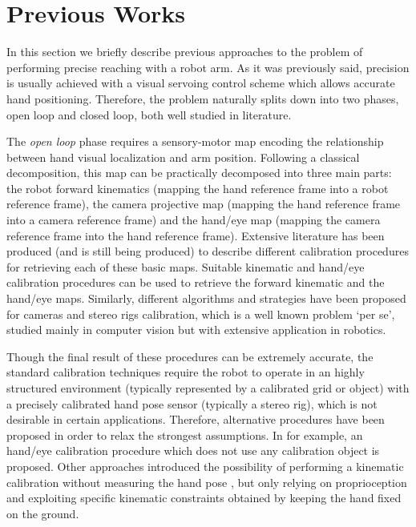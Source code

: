 \section{Previous Works}



In this section we briefly describe previous approaches to the problem of performing precise reaching with a robot arm. As it was previously said, precision is usually achieved with a visual servoing control scheme which allows accurate hand positioning. Therefore, the problem naturally splits down into two phases, open loop and closed loop, both well studied in literature.

The {\em open loop} phase requires a sensory-motor map encoding the relationship between hand visual localization and arm position. Following a classical decomposition, this map can be practically decomposed into three main parts: the robot forward kinematics (mapping the hand reference frame into a robot reference frame), the camera projective map (mapping the hand reference frame into a camera reference frame) and the hand/eye map (mapping the camera reference frame into the hand reference frame). Extensive literature has been produced (and is still being produced) to describe different calibration procedures for retrieving each of these basic maps. Suitable kinematic \cite{Hollerbach96calibration} and hand/eye \cite{Tsai88calibration} calibration procedures can be used to retrieve the forward kinematic and the hand/eye maps. Similarly, different algorithms and strategies have been proposed for cameras and stereo rigs calibration, which is a well known problem `per se', studied mainly in computer vision \cite{Soatto03vision} but with extensive application in robotics. 

Though the final result of these procedures can be extremely accurate, the standard calibration techniques require the robot to operate in an highly structured environment (typically represented by a calibrated grid or object) with a precisely calibrated hand pose sensor (typically a stereo rig), which is not desirable in certain applications. Therefore, alternative procedures have been proposed in order to relax the strongest assumptions. In \cite{AHE01} for example, an hand/eye calibration procedure which does not use any calibration object is proposed. Other approaches introduced the possibility of performing a kinematic calibration without measuring the hand pose \cite{Bennett91calibration}, but only relying on proprioception and exploiting specific kinematic constraints obtained by keeping the hand fixed on the ground. 


